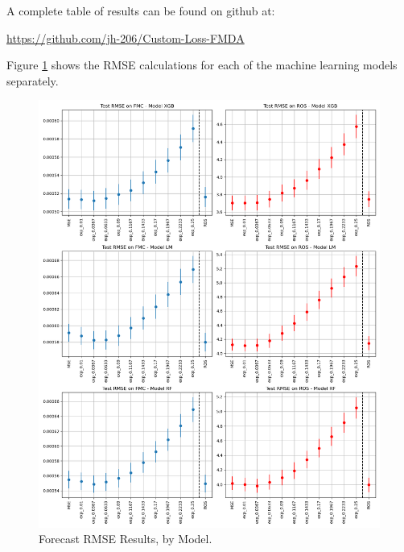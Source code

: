 \documentclass[11pt]{article}%
\begin{document}
A complete table of results can be found on github at: 

\url{https://github.com/jh-206/Custom-Loss-FMDA}

Figure \ref{fig:results2} shows the RMSE calculations for each of the machine learning models separately.

\begin{figure}[ht]
    \centering
    \includegraphics[width=1\textwidth]{images/results2.png}
    \caption{Forecast RMSE Results, by Model.}
    \label{fig:results2}
\end{figure}
\end{document}
